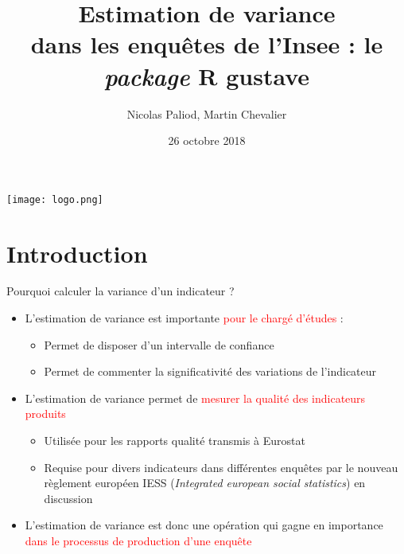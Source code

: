 \documentclass[xcolor=dvipsnames]{beamer}
\author {Nicolas Paliod, Martin Chevalier}
\title{Estimation de variance \\ dans les enquêtes de l'Insee : le \textit{package} R gustave}
\institute{10ème Colloque francophone sur les sondages \\ Session Estimation de variance et Robustesse}
\date{26 octobre 2018}
\begin{document}
\begin{frame}
\maketitle 
\begin{center}
\texttt{[image: logo.png]}
\end{center}
\end{frame}

\section*{Introduction}

\begin{frame}{Pourquoi calculer la variance d'un indicateur ?}

\begin{itemize}
    \item L'estimation de variance est importante \textcolor{red}{pour le chargé d'études} :
    \begin{itemize}
        \vspace{0.1cm}
        \item Permet de disposer d'un intervalle de confiance
        \vspace{0.1cm}
        \item Permet de commenter la significativité des variations de l'indicateur
    \end{itemize}
    
    \vspace{0.2cm}
    \item L'estimation de variance permet de \textcolor{red}{mesurer la qualité des indicateurs produits}
    \begin{itemize}
        \vspace{0.1cm}
        \item Utilisée pour les rapports qualité transmis à Eurostat
        \vspace{0.1cm}
        \item Requise pour divers indicateurs dans différentes enquêtes par le nouveau règlement européen IESS (\textit{Integrated european social statistics}) en discussion
    \end{itemize}
    
    \vspace{0.2cm}
   
    \item L'estimation de variance est donc une opération qui gagne en importance \textcolor{red}{dans le processus de production d’une enquête}
\end{itemize}

\end{frame}
\end{document}

